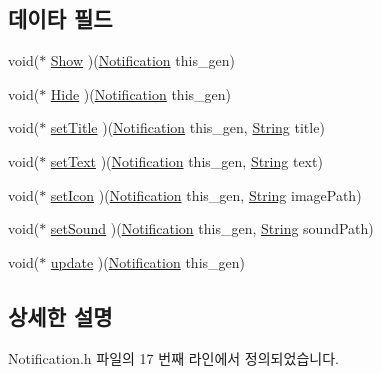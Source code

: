 \subsection*{데이타 필드}
\begin{DoxyCompactItemize}
\item 
void($\ast$ \hyperlink{struct___notification_ab9b2b384b324352b76dbd9630f56fbbd}{Show} )(\hyperlink{_notification_8h_a89fa64926bb603299f73fe94ebd3a966}{Notification} this\-\_\-gen)
\item 
void($\ast$ \hyperlink{struct___notification_afebf9eb8c3faebc7a4c31e0a4a304889}{Hide} )(\hyperlink{_notification_8h_a89fa64926bb603299f73fe94ebd3a966}{Notification} this\-\_\-gen)
\item 
void($\ast$ \hyperlink{struct___notification_a73a3d4126ff83547c55a74c8d31223bf}{set\-Title} )(\hyperlink{_notification_8h_a89fa64926bb603299f73fe94ebd3a966}{Notification} this\-\_\-gen, \hyperlink{dit_8h_a2efe6d463d80744789f228f5dc4baa39}{String} title)
\item 
void($\ast$ \hyperlink{struct___notification_a8c4bcdca602f3eb58482c39ecd39f1e8}{set\-Text} )(\hyperlink{_notification_8h_a89fa64926bb603299f73fe94ebd3a966}{Notification} this\-\_\-gen, \hyperlink{dit_8h_a2efe6d463d80744789f228f5dc4baa39}{String} text)
\item 
void($\ast$ \hyperlink{struct___notification_a73b07a7d9dc89b95a4941d754f729deb}{set\-Icon} )(\hyperlink{_notification_8h_a89fa64926bb603299f73fe94ebd3a966}{Notification} this\-\_\-gen, \hyperlink{dit_8h_a2efe6d463d80744789f228f5dc4baa39}{String} image\-Path)
\item 
void($\ast$ \hyperlink{struct___notification_a51f29ca15c81900eb431f952bc7a864c}{set\-Sound} )(\hyperlink{_notification_8h_a89fa64926bb603299f73fe94ebd3a966}{Notification} this\-\_\-gen, \hyperlink{dit_8h_a2efe6d463d80744789f228f5dc4baa39}{String} sound\-Path)
\item 
void($\ast$ \hyperlink{struct___notification_a0b608c07f45459f63d0bed2f4f6c5962}{update} )(\hyperlink{_notification_8h_a89fa64926bb603299f73fe94ebd3a966}{Notification} this\-\_\-gen)
\end{DoxyCompactItemize}


\subsection{상세한 설명}


Notification.\-h 파일의 17 번째 라인에서 정의되었습니다.



